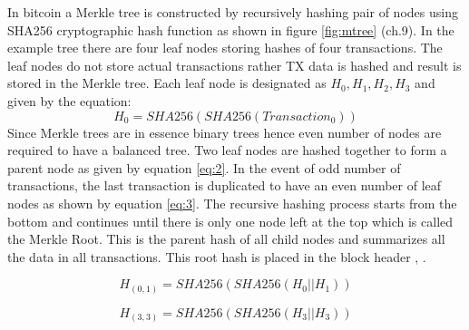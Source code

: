 In bitcoin a Merkle tree is constructed by recursively hashing pair of nodes using SHA256 cryptographic hash function as shown in figure \ref{fig:mtree} \cite{andy_mb} (ch.9).  In the example tree there are four leaf nodes storing hashes of four transactions. The leaf nodes do not store actual transactions rather TX data is hashed and result is stored in the Merkle tree. Each leaf node is designated as \( H_{0}, H_{1}, H_{2}, H_{3} \) and given by the equation: \[ H_{0} = SHA256(SHA256(Transaction_{0}))\]
Since Merkle trees are in essence binary trees hence even number of nodes are required to have a balanced tree. Two leaf nodes are hashed together to form a parent node as given by equation \eqref{eq:2}. In the event of odd number of transactions, the last transaction is duplicated to have an even number of leaf nodes as shown by equation \eqref{eq:3}. The recursive hashing process starts from the bottom and continues until there is only one node left at the top which is called the Merkle Root. This is the parent hash of all child nodes and summarizes all the data in all transactions. This root hash is placed in the block header \cite{cryptoeprint:2018:274}, \cite{paper:001}.

\begin{equation}
  \label{eq:2}
H_{(0,1)} = SHA256(SHA256(H_{0} || H_{1}))
\end{equation}

\begin{equation}
  \label{eq:3}
 H_{(3,3)} = SHA256(SHA256(H_{3} || H_{3}))
\end{equation}


\vspace{0.5cm}
